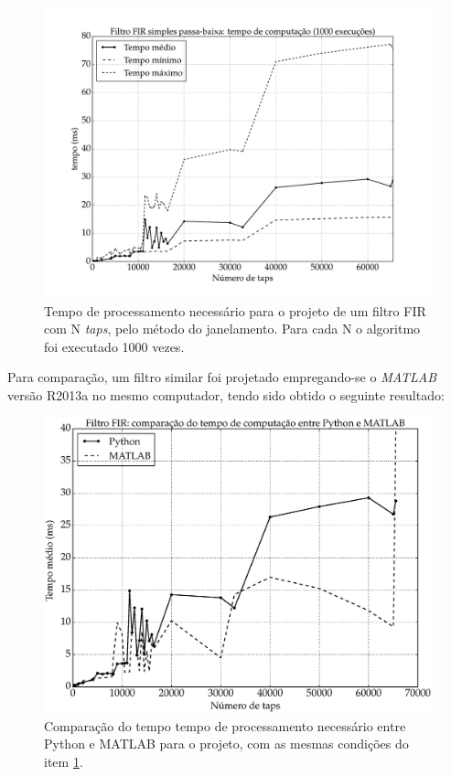 \begin{figure}[H]
  \centering
  \includegraphics[scale=0.5]{images/plots/fir_benchmark}
 \caption{Tempo de processamento necessário para o projeto de um filtro FIR com N \textit{taps}, pelo método do janelamento. Para cada N o algoritmo foi executado 1000 vezes.}
 \label{fig:fir_benchmark}
\end{figure}

\newpage
Para comparação, um filtro similar foi projetado empregando-se o \textit{MATLAB} versão R2013a no mesmo computador, tendo sido obtido o seguinte resultado:

\begin{figure}[H]
  \centering
  \includegraphics[scale=0.5]{images/plots/fir_comparison}
 \caption{Comparação do tempo tempo de processamento necessário entre Python e MATLAB para o projeto, com as mesmas condições do item \ref{fig:fir_benchmark}.}
 \label{fig:fir_comparison}
\end{figure}


